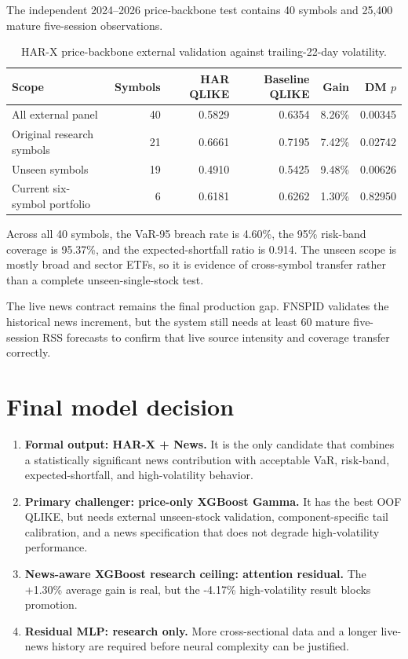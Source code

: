 \documentclass[10pt]{article}
\begin{document}
The independent 2024--2026 price-backbone test contains 40 symbols and 25,400
mature five-session observations.

\begin{table}[ht]
\centering
\caption{HAR-X price-backbone external validation against trailing-22-day volatility.}
\small
\begin{tabular}{lrrrrr}
\toprule
Scope & Symbols & HAR QLIKE & Baseline QLIKE & Gain & DM \(p\) \\
\midrule
All external panel & 40 & 0.5829 & 0.6354 & 8.26\% & 0.00345 \\
Original research symbols & 21 & 0.6661 & 0.7195 & 7.42\% & 0.02742 \\
Unseen symbols & 19 & 0.4910 & 0.5425 & 9.48\% & 0.00626 \\
Current six-symbol portfolio & 6 & 0.6181 & 0.6262 & 1.30\% & 0.82950 \\
\bottomrule
\end{tabular}
\end{table}

Across all 40 symbols, the VaR-95 breach rate is 4.60\%, the 95\% risk-band
coverage is 95.37\%, and the expected-shortfall ratio is 0.914. The unseen
scope is mostly broad and sector ETFs, so it is evidence of cross-symbol
transfer rather than a complete unseen-single-stock test.

\newpage
The live news contract remains the final production gap. FNSPID validates the
historical news increment, but the system still needs at least 60 mature
five-session RSS forecasts to confirm that live source intensity and coverage
transfer correctly.

\section{Final model decision}

\begin{enumerate}
  \item \textbf{Formal output: HAR-X + News.}
        It is the only candidate that combines a statistically significant news
        contribution with acceptable VaR, risk-band, expected-shortfall, and
        high-volatility behavior.
  \item \textbf{Primary challenger: price-only XGBoost Gamma.}
        It has the best OOF QLIKE, but needs external unseen-stock validation,
        component-specific tail calibration, and a news specification that does
        not degrade high-volatility performance.
  \item \textbf{News-aware XGBoost research ceiling: attention residual.}
        The +1.30\% average gain is real, but the -4.17\% high-volatility result
        blocks promotion.
  \item \textbf{Residual MLP: research only.}
        More cross-sectional data and a longer live-news history are required
        before neural complexity can be justified.
\end{enumerate}
\end{document}
